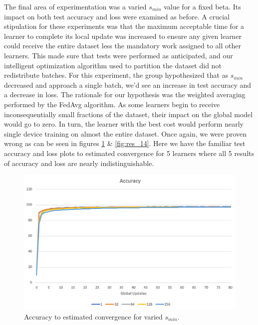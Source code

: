 \documentclass[../mthe-493-final-project.tex]{subfiles}
\begin{document}
    The final area of experimentation was a varied $s_{min}$ value for a fixed beta. Its impact on both test accuracy and loss were examined as before. A crucial stipulation for these experiments was that the maximum acceptable time for a learner to complete its local update was increased to ensure any given learner could receive the entire dataset less the mandatory work assigned to all other learners. This made sure that tests were performed as anticipated, and our intelligent optimization algorithm used to partition the dataset did not redistribute batches. For this experiment, the group hypothesized that as $s_{min}$ decreased and approach a single batch, we’d see an increase in test accuracy and a decrease in loss. The rationale for our hypothesis was the weighted averaging performed by the FedAvg algorithm. As some learners begin to receive inconsequentially small fractions of the dataset, their impact on the global model would go to zero. In turn, the learner with the best cost would perform nearly single device training on almost the entire dataset. Once again, we were proven wrong as can be seen in figures \ref{fig:res_13} \& \ref{fig:res_14}. Here we have the familiar test accuracy and loss plots to estimated convergence for 5 learners where all 5 results of accuracy and loss are nearly indistinguishable. 
    \begin{figure}
        \centering
        \includegraphics[width=150mm]{thesis/img/res_13.png}
        \caption{Accuracy to estimated convergence for varied $s_{min}$.}
        \label{fig:res_13}
    \end{figure}
\end{document}
